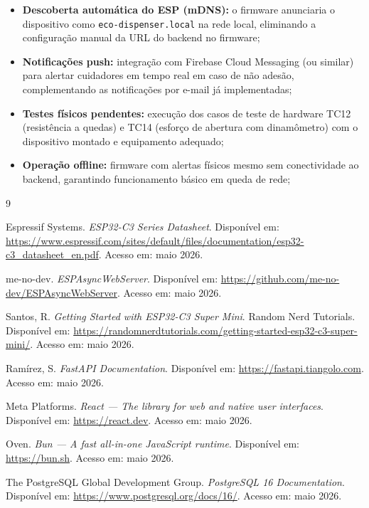 \documentclass[12pt,a4paper]{article}
\begin{document}
\begin{itemize}
    \item \textbf{Descoberta automática do ESP (mDNS):} o firmware anunciaria o dispositivo como \texttt{eco-dispenser.local} na rede local, eliminando a configuração manual da URL do backend no firmware;
    \item \textbf{Notificações push:} integração com Firebase Cloud Messaging (ou similar) para alertar cuidadores em tempo real em caso de não adesão, complementando as notificações por e-mail já implementadas;
    \item \textbf{Testes físicos pendentes:} execução dos casos de teste de hardware TC12 (resistência a quedas) e TC14 (esforço de abertura com dinamômetro) com o dispositivo montado e equipamento adequado;
    \item \textbf{Operação offline:} firmware com alertas físicos mesmo sem conectividade ao backend, garantindo funcionamento básico em queda de rede;
\end{itemize}

\newpage

\begin{thebibliography}{9}

Espressif Systems.
\textit{ESP32-C3 Series Datasheet}.
Disponível em: \url{https://www.espressif.com/sites/default/files/documentation/esp32-c3_datasheet_en.pdf}.
Acesso em: maio 2026.

me-no-dev.
\textit{ESPAsyncWebServer}.
Disponível em: \url{https://github.com/me-no-dev/ESPAsyncWebServer}.
Acesso em: maio 2026.

Santos, R.
\textit{Getting Started with ESP32-C3 Super Mini}.
Random Nerd Tutorials.
Disponível em: \url{https://randomnerdtutorials.com/getting-started-esp32-c3-super-mini/}.
Acesso em: maio 2026.

Ramírez, S.
\textit{FastAPI Documentation}.
Disponível em: \url{https://fastapi.tiangolo.com}.
Acesso em: maio 2026.

Meta Platforms.
\textit{React — The library for web and native user interfaces}.
Disponível em: \url{https://react.dev}.
Acesso em: maio 2026.

Oven.
\textit{Bun — A fast all-in-one JavaScript runtime}.
Disponível em: \url{https://bun.sh}.
Acesso em: maio 2026.

The PostgreSQL Global Development Group.
\textit{PostgreSQL 16 Documentation}.
Disponível em: \url{https://www.postgresql.org/docs/16/}.
Acesso em: maio 2026.

\end{thebibliography}
\end{document}
